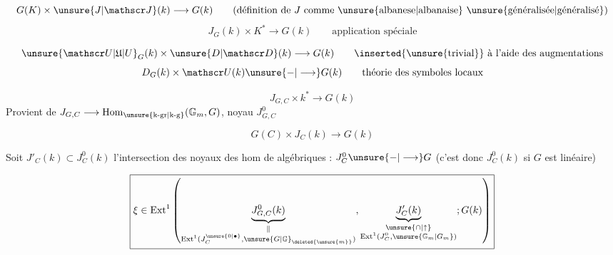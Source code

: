 \[
G(K)\times\unsure{J|\mathscr J}(k)\longrightarrow G(k)\qquad
\text{(définition de }J\text{ comme \unsure{albanese|albanaise} \unsure{généralisée|généralisé})}
\]
\[
J_G(k)\times K^*\longrightarrow G(k)\qquad\text{application spéciale}
\]

\[
{\unsure{\mathscr U|\mathfrak U|U}}_G(k)\times\unsure{D|\mathscr D}(k)\longrightarrow G(k)
\qquad\text{\inserted{\unsure{trivial}} à l'aide des augmentations}
\]
\[
D_G(k)\times\mathscr U(k)\unsure{-|\longrightarrow}G(k)\qquad\text{théorie des symboles locaux}
\]

\[
J_{G,C}\times k^*\longrightarrow G(k)
\]
Provient de $J_{G,C}\longrightarrow\operatorname{Hom}_{\text{\unsure{k-gr|k-g}}}(\mathbb G_m,G)$, noyau $J_{G,C}^0$

\[
G(C)\times J_C(k)\longrightarrow G(k)
\]

Soit $J'_C(k)\subset J_C^0(k)$ l'intersection des noyaux des hom de  algébriques : $J_C^0\unsure{-|\longrightarrow}G$ (c'est donc $J_C^0(k)$ si $G$ est linéaire)

\[
\boxed{\xi\in\operatorname{Ext}^1\left(
\underbrace{J_{G,C}^0(k)}_{\substack{\Vert\\\operatorname{Ext}^1(J_C^{\unsure{0|\bullet}},{\unsure{G|\mathbb G}}_{\deleted{\unsure{m}}})}},
\underbrace{J'_C(k)}_{\substack{\unsure{\cap|\uparrow}\\\operatorname{Ext}^1(J_C^0,\unsure{\mathbb G_m|G_m})}};
G(k)\right)}
\]

